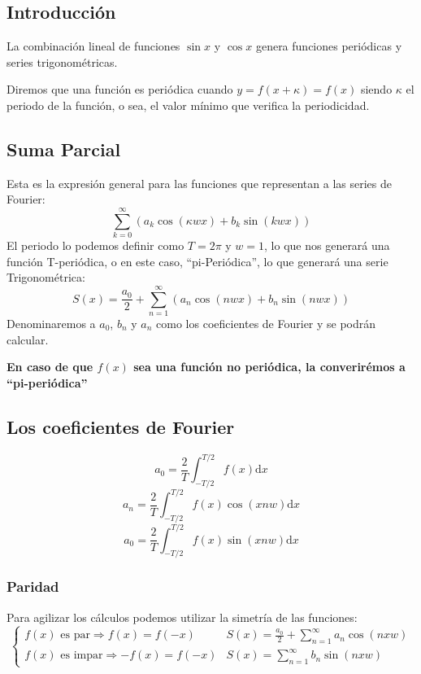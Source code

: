 \subsection{Introducción}
\noindent La combinación lineal de funciones \(\sin{x}\) y \(\cos{x}\) genera funciones periódicas y series trigonométricas.
\par \noindent Diremos que una función es periódica cuando \(y = f(x + \kappa) = f(x)\) siendo \(\kappa\) el periodo de la función, o sea, el valor mínimo que verifica la periodicidad.
\subsection{Suma Parcial}
\noindent Esta es la expresión general para las funciones que representan a las series de Fourier:
\[
        \boxed{\sum^{\infty}_{k=0}(a_k \cos{(\kappa w x)} + b_k \sin{(kwx)})}
\]
\noindent El periodo lo podemos definir como \(T = 2\pi\) y \(w = 1\), lo que nos generará una función T-periódica, o en este caso, ``pi-Periódica'', lo que generará una serie Trigonométrica:
\[
        \boxed{S(x) = \frac{a_0}{2}+\sum^{\infty}_{n=1}(a_n \cos{( nw x)} + b_n \sin{(nwx)})}
\]
\noindent Denominaremos a \(a_0\), \(b_n\) y \(a_n\) como los coeficientes de Fourier y se podrán calcular.
\par \noindent \textbf{En caso de que \(f(x)\) sea una función no periódica, la converirémos a ``pi-periódica''}
\subsection{Los coeficientes de Fourier}
\[
        \boxed{a_0 = \frac{2}{T} \int^{T/2}_{-T/2}f(x)\mathrm{d} x}
\]
\[
        \boxed{a_n = \frac{2}{T} \int^{T/2}_{-T/2}f(x)\cos{(xnw)}\mathrm{d} x}
\]
\[
        \boxed{a_0 = \frac{2}{T} \int^{T/2}_{-T/2}f(x)\sin{(xnw)}\mathrm{d} x}
\]
\subsubsection{Paridad}
\noindent Para agilizar los cálculos podemos utilizar la simetría de las funciones:
\[
        \begin{cases}
                \text{\(f(x)\) es par} \Rightarrow f(x) = f(-x)    & S(x) = \frac{a_0}{2} +\sum^{\infty}_{n=1}a_n \cos{(nxw)}
                \\
                \text{\(f(x)\) es impar} \Rightarrow -f(x) = f(-x) & S(x)=\sum^{\infty}_{n=1}b_n \sin{(nxw)}
        \end{cases}
\]
